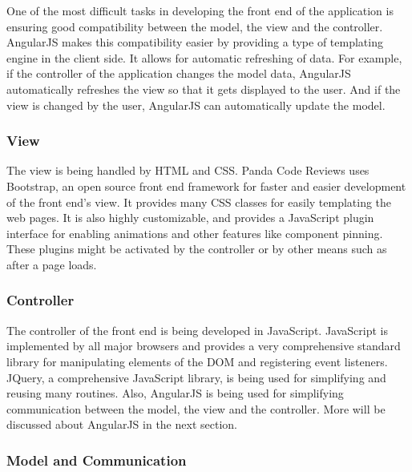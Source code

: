One of the most difficult tasks in developing the front end of the application
is ensuring good compatibility between the model, the view and the controller.
AngularJS makes this compatibility easier by providing a type of templating
engine in the client side. It allows for automatic refreshing of data. For
example, if the controller of the application changes the model data, AngularJS
automatically refreshes the view so that it gets displayed to the user. And if
the view is changed by the user, AngularJS can automatically update the model.

\subsubsection{View}

The view is being handled by HTML and CSS. Panda Code Reviews uses Bootstrap, an
open source front end framework for faster and easier development of the front
end's view. It provides many CSS classes for easily templating the web pages. It
is also highly customizable, and provides a JavaScript plugin interface for
enabling animations and other features like component pinning. These plugins
might be activated by the controller or by other means such as after a page
loads.

\subsubsection{Controller}

The controller of the front end is being developed in JavaScript. JavaScript is
implemented by all major browsers and provides a very comprehensive standard
library for manipulating elements of the DOM and registering event listeners.
JQuery, a comprehensive JavaScript library, is being used for simplifying and
reusing many routines. Also, AngularJS is being used for simplifying
communication between the model, the view and the controller. More will be
discussed about AngularJS in the next section.

\subsubsection{Model and Communication}

